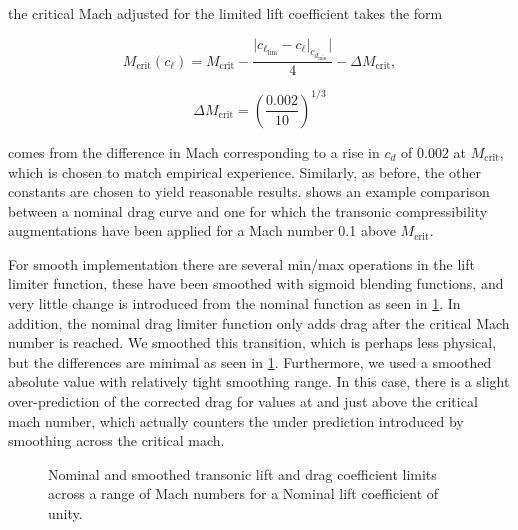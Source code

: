 \where the critical Mach adjusted for the limited lift coefficient takes the form

\begin{equation}
    \label{eqn:mcritcl}
    M_\text{crit}(c_\ell) = M_\text{crit} - \frac{\bigg|c_{\ell_\text{lim}} - \left.c_\ell\right|_{c_{d_\text{min}}}\bigg|}{4} - \Delta M_\text{crit},
\end{equation}

\where

\begin{equation}
    \Delta M_\text{crit} = \left(\frac{0.002}{10}\right)^{1/3}
\end{equation}

\noindent comes from the difference in Mach corresponding to a rise in \(c_d\) of 0.002 at \(M_\text{crit}\), which is chosen to match empirical experience.
%
Similarly, as before, the other constants are chosen to yield reasonable results.
%
 shows an example comparison between a nominal drag curve and one for which the transonic compressibility augmentations have been applied for a Mach number 0.1 above \(M_\text{crit}\).


For smooth implementation there are several min/max operations in the lift limiter function, these have been smoothed with sigmoid blending functions, and very little change is introduced from the nominal function as seen in \cref{fig:translim-smoothed}.
%
In addition, the nominal drag limiter function only adds drag after the critical Mach number is reached.
%
We smoothed this transition, which is perhaps less physical, but the differences are minimal as seen in \cref{fig:translim-smoothed}.
%
Furthermore, we used a smoothed absolute value with relatively tight smoothing range.
%
In this case, there is a slight over-prediction of the corrected drag for values at and just above the critical mach number, which actually counters the under prediction introduced by smoothing across the critical mach.

\begin{figure}[htb]
     \centering
     \begin{subfigure}[t]{0.45\textwidth}
         \centering
        
     \end{subfigure}
     \hfill
     \begin{subfigure}[t]{0.45\textwidth}
         \centering
         
     \end{subfigure}
     \caption{Nominal and smoothed transonic lift and drag coefficient limits across a range of Mach numbers for a Nominal lift coefficient of unity.}
        \label{fig:translim-smoothed}
\end{figure}


